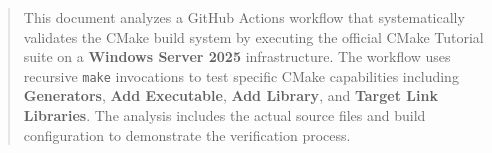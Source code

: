 \begin{abstract}
    This document analyzes a GitHub Actions workflow that systematically validates the CMake build system by executing the official CMake Tutorial suite on a \textbf{Windows Server 2025} infrastructure. The workflow uses recursive \texttt{make} invocations to test specific CMake capabilities including \textbf{Generators}, \textbf{Add Executable}, \textbf{Add Library}, and \textbf{Target Link Libraries}. The analysis includes the actual source files and build configuration to demonstrate the verification process.
\end{abstract}

